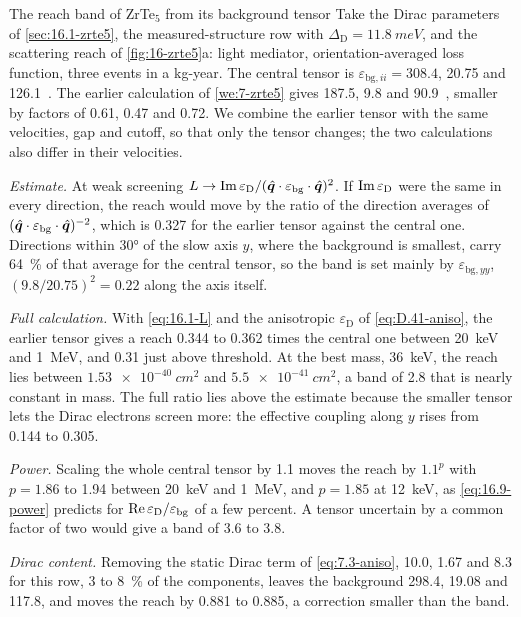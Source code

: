 \begin{workedexample}{The reach band of ZrTe$_5$ from its background tensor}\label{we:16-band}
Take the Dirac parameters of \cref{sec:16.1-zrte5}, the measured-structure row with $\Delta_{\mathrm{D}} = \SI{11.8}{meV}$, and the scattering reach of \cref{fig:16-zrte5}a: light mediator, orientation-averaged loss function, three events in a kg-year. The central tensor is $\varepsilon_{\mathrm{bg},ii} = 308.4$, 20.75 and 126.1~\cite[Table~2]{geilhufe2020dirac}. The earlier calculation of \cref{we:7-zrte5} gives 187.5, 9.8 and 90.9~\cite[Table~1]{hochberg2018detection}, smaller by factors of 0.61, 0.47 and 0.72. We combine the earlier tensor with the same velocities, gap and cutoff, so that only the tensor changes; the two calculations also differ in their velocities.

\emph{Estimate.} At weak screening $L \to \operatorname{Im}\varepsilon_{\mathrm{D}}/(\hat{\bm{q}}\cdot\varepsilon_{\mathrm{bg}}\cdot\hat{\bm{q}})^2$. If $\operatorname{Im}\varepsilon_{\mathrm{D}}$ were the same in every direction, the reach would move by the ratio of the direction averages of $(\hat{\bm{q}}\cdot\varepsilon_{\mathrm{bg}}\cdot\hat{\bm{q}})^{-2}$, which is 0.327 for the earlier tensor against the central one. Directions within \ang{30} of the slow axis $y$, where the background is smallest, carry \SI{64}{\percent} of that average for the central tensor, so the band is set mainly by $\varepsilon_{\mathrm{bg},yy}$, $(9.8/20.75)^2 = 0.22$ along the axis itself.

\emph{Full calculation.} With \cref{eq:16.1-L} and the anisotropic $\varepsilon_{\mathrm{D}}$ of \cref{eq:D.41-aniso}, the earlier tensor gives a reach 0.344 to 0.362 times the central one between \SI{20}{keV} and \SI{1}{MeV}, and 0.31 just above threshold. At the best mass, \SI{36}{keV}, the reach lies between $\SI{1.53e-40}{cm^2}$ and $\SI{5.5e-41}{cm^2}$, a band of 2.8 that is nearly constant in mass. The full ratio lies above the estimate because the smaller tensor lets the Dirac electrons screen more: the effective coupling along $y$ rises from 0.144 to 0.305.

\emph{Power.} Scaling the whole central tensor by 1.1 moves the reach by $1.1^p$ with $p = 1.86$ to 1.94 between \SI{20}{keV} and \SI{1}{MeV}, and $p = 1.85$ at \SI{12}{keV}, as \cref{eq:16.9-power} predicts for $\operatorname{Re}\varepsilon_{\mathrm{D}}/\varepsilon_{\mathrm{bg}}$ of a few percent. A tensor uncertain by a common factor of two would give a band of 3.6 to 3.8.

\emph{Dirac content.} Removing the static Dirac term of \cref{eq:7.3-aniso}, 10.0, 1.67 and 8.3 for this row, 3 to \SI{8}{\percent} of the components, leaves the background 298.4, 19.08 and 117.8, and moves the reach by 0.881 to 0.885, a correction smaller than the band.


\end{workedexample}
